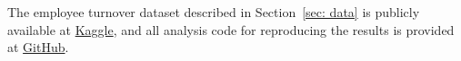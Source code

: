 The employee turnover dataset described in Section~\ref{sec: data} is publicly available at \href{https://www.kaggle.com/datasets/davinwijaya/employee-turnover/data}{Kaggle}, and all analysis code for reproducing the results is provided at \href{https://github.com/zooogi/Statistics-Research-Project.git}{GitHub}.